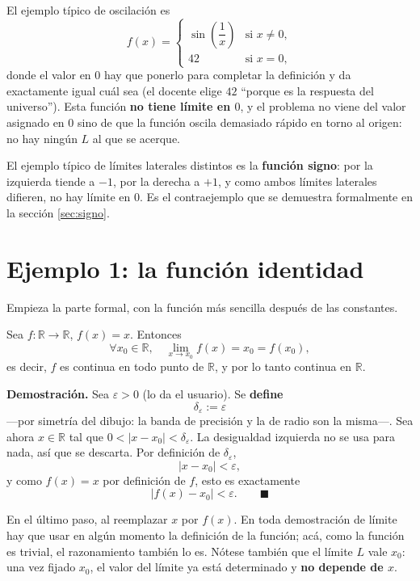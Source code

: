\documentclass[12pt,a4paper]{article}
\begin{document}
El ejemplo típico de oscilación es
\[
  f(x) = \begin{cases}
    \sin\!\left(\dfrac{1}{x}\right) & \text{si } x \neq 0, \\[0.8em]
    42 & \text{si } x = 0,
  \end{cases}
\]
donde el valor en $0$ hay que ponerlo para completar la definición y da
exactamente igual cuál sea (el docente elige $42$ ``porque es la respuesta del
universo''). Esta función \textbf{no tiene límite en $0$}, y el problema no
viene del valor asignado en $0$ sino de que la función oscila demasiado rápido
en torno al origen: no hay ningún $L$ al que se acerque.

El ejemplo típico de límites laterales distintos es la \textbf{función signo}:
por la izquierda tiende a $-1$, por la derecha a $+1$, y como ambos límites
laterales difieren, no hay límite en $0$. Es el contraejemplo que se demuestra
formalmente en la sección \ref{sec:signo}.



\section{Ejemplo 1: la función identidad}

Empieza la parte formal, con la función más sencilla después de las
constantes.

\begin{keybox}
Sea $f : \mathbb{R} \to \mathbb{R}$, $f(x) = x$. Entonces
\[
  \forall x_0 \in \mathbb{R}, \quad \lim_{x \to x_0} f(x) = x_0 = f(x_0),
\]
es decir, $f$ es continua en todo punto de $\mathbb{R}$, y por lo tanto
continua en $\mathbb{R}$.
\end{keybox}

\textbf{Demostración.} Sea $\varepsilon > 0$ (lo da el usuario). Se
\textbf{define}
\[
  \boxed{\delta_\varepsilon := \varepsilon}
\]
---por simetría del dibujo: la banda de precisión y la de radio son la
misma---. Sea ahora $x \in \mathbb{R}$ tal que
$0 < |x - x_0| < \delta_\varepsilon$. La desigualdad izquierda no se usa para
nada, así que se descarta. Por definición de $\delta_\varepsilon$,
\[
  |x - x_0| < \varepsilon,
\]
y como $f(x) = x$ por definición de $f$, esto es exactamente
\[
  |f(x) - x_0| < \varepsilon. \qquad \blacksquare
\]

\begin{notebox}
En el último paso, al reemplazar $x$ por $f(x)$. En toda demostración de
límite hay que usar en algún momento la definición de la función; acá, como la
función es trivial, el razonamiento también lo es. Nótese también que el
límite $L$ vale $x_0$: una vez fijado $x_0$, el valor del límite ya está
determinado y \textbf{no depende de $x$}.
\end{notebox}
\end{document}
